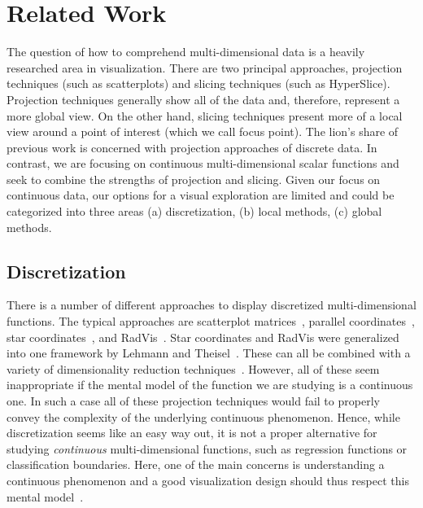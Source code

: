 \section{Related Work}\label{sec:background}

The question of how to comprehend multi-dimensional data is a heavily
researched area in visualization. There are two principal approaches,
projection techniques (such as scatterplots) and slicing techniques (such as
HyperSlice). Projection techniques generally show all of the data and,
therefore, represent a more global view. On the other hand, slicing techniques
present more of a local view around a point of interest (which we call focus
point). The lion's share of previous work is concerned with projection
approaches of discrete data. In contrast, we are focusing on continuous
multi-dimensional scalar functions and seek to combine the strengths of
projection and slicing. Given our focus on continuous data, our options for a
visual exploration are limited and could be categorized into three areas (a)
discretization, (b) local methods, (c) global methods.

\subsection{Discretization}

There is a number of different approaches to display discretized
multi-dimensional functions. The typical approaches are scatterplot
matrices~\cite{Hartigan:1975}, parallel coordinates~\cite{Inselberg:1985}, star
coordinates~\cite{Kandogan:2000}, and RadVis~\cite{Hoffman:1997}. 
Star coordinates and RadVis were generalized into one framework by Lehmann
and Theisel~\cite{Lehmann:2016a}.
These can all be combined with a variety of dimensionality
reduction techniques~\cite{Holbrey:2006}. However, all of these seem
inappropriate if the mental model of the function we are studying is a continuous
one. In such a case all of these projection techniques would fail to properly
convey the complexity of the underlying continuous phenomenon. Hence, while
discretization seems like an easy way out, it is not a proper alternative for
studying \emph{continuous} multi-dimensional functions, such as regression
functions or classification boundaries. Here, one of the main concerns is
understanding a continuous phenomenon and a good visualization design should
thus respect this mental model~\cite{Tory:2004a,Sedlmair:2012,Liu:2010a}.

